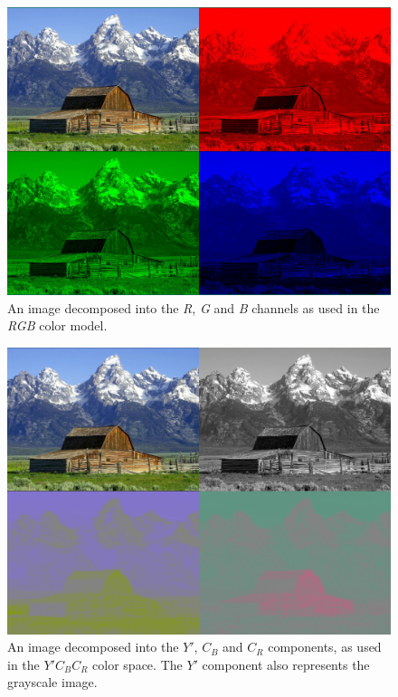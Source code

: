 \documentclass[thesis=M,english]{FITthesis}[2012/10/20]
\begin{document}
\begin{figure}[h]
  \centering
  \includegraphics[scale=0.5]{imgs/house-rgbdecomp}
  \caption{An image decomposed into the \emph{R}, \emph{G} and \emph{B} channels
           as used in the \emph{RGB} color model.}
  \label{fig:house-rgbdecomp}
\end{figure}

\begin{figure}[h]
  \centering
  \includegraphics[scale=0.5]{imgs/houses-decomp-ycbcr}
  \caption{An image decomposed into the $Y'$, $C_B$ and $C_R$ components, as used
           in the $Y'C_BC_R$ color space. The $Y'$ component also represents the
           grayscale image.}
  \label{fig:house-ycbcrdecomp}
\end{figure}
\end{document}
